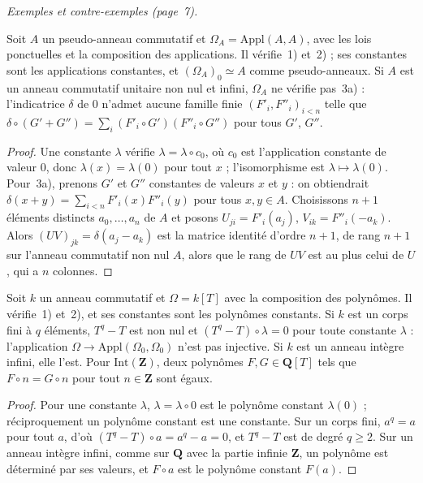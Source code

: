 \medskip
\noindent\textit{Exemples et contre-exemples (page~7).}

\begin{enonce}
Soit $A$ un pseudo-anneau commutatif et $\Omega_A = \mathrm{Appl}(A, A)$, avec les lois ponctuelles et la composition des applications. Il vérifie~1) et~2) ; ses constantes sont les applications constantes, et $(\Omega_A)_0 \simeq A$ comme pseudo-anneaux. Si $A$ est un anneau commutatif unitaire non nul et infini, $\Omega_A$ ne vérifie pas~3a) : l'indicatrice $\delta$ de $0$ n'admet aucune famille finie $(F'_i, F''_i)_{i < n}$ telle que $\delta \circ (G' + G'') = \sum_i (F'_i \circ G')(F''_i \circ G'')$ pour tous $G'$, $G''$.
\end{enonce}

\begin{proof}
Une constante $\lambda$ vérifie $\lambda = \lambda \circ c_0$, où $c_0$ est l'application constante de valeur $0$, donc $\lambda(x) = \lambda(0)$ pour tout $x$ ; l'isomorphisme est $\lambda \mapsto \lambda(0)$. Pour~3a), prenons $G'$ et $G''$ constantes de valeurs $x$ et $y$ : on obtiendrait $\delta(x + y) = \sum_{i < n} F'_i(x) F''_i(y)$ pour tous $x, y \in A$. Choisissons $n + 1$ éléments distincts $a_0, \dots, a_n$ de $A$ et posons $U_{ji} = F'_i(a_j)$, $V_{ik} = F''_i(-a_k)$. Alors $(UV)_{jk} = \delta(a_j - a_k)$ est la matrice identité d'ordre $n + 1$, de rang $n + 1$ sur l'anneau commutatif non nul $A$, alors que le rang de $UV$ est au plus celui de $U$, qui a $n$ colonnes.
\end{proof}

\begin{enonce}
Soit $k$ un anneau commutatif et $\Omega = k[T]$ avec la composition des polynômes. Il vérifie~1) et~2), et ses constantes sont les polynômes constants. Si $k$ est un corps fini à $q$ éléments, $T^q - T$ est non nul et $(T^q - T) \circ \lambda = 0$ pour toute constante $\lambda$ : l'application $\Omega \to \mathrm{Appl}(\Omega_0, \Omega_0)$ n'est pas injective. Si $k$ est un anneau intègre infini, elle l'est. Pour $\mathrm{Int}(\mathbf Z)$, deux polynômes $F, G \in \mathbf Q[T]$ tels que $F \circ n = G \circ n$ pour tout $n \in \mathbf Z$ sont égaux.
\end{enonce}

\begin{proof}
Pour une constante $\lambda$, $\lambda = \lambda \circ 0$ est le polynôme constant $\lambda(0)$ ; réciproquement un polynôme constant est une constante. Sur un corps fini, $a^q = a$ pour tout $a$, d'où $(T^q - T) \circ a = a^q - a = 0$, et $T^q - T$ est de degré $q \geq 2$. Sur un anneau intègre infini, comme sur $\mathbf Q$ avec la partie infinie $\mathbf Z$, un polynôme est déterminé par ses valeurs, et $F \circ a$ est le polynôme constant $F(a)$.
\end{proof}

